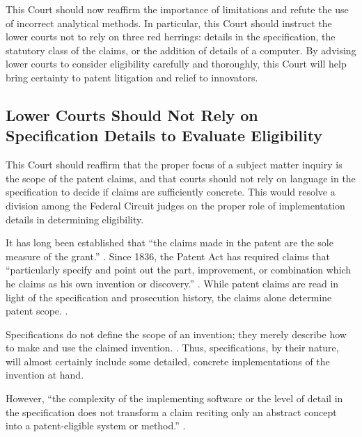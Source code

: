 \documentclass{scotus}
\begin{document}
This Court should now reaffirm the importance of  limitations and
refute the use of incorrect analytical methods. In particular, this Court should
instruct the lower courts not to rely on three red herrings: details in the
specification, the statutory class of the claims,
or the addition of details of a computer. By advising lower courts to consider
eligibility carefully and thoroughly, this Court will help bring certainty to
patent litigation and relief to innovators. 


%
%
\subsection{Lower Courts Should Not Rely on
Specification Details to Evaluate Eligibility}

This Court should reaffirm that the proper focus of a  subject
matter inquiry is the scope of the patent claims, and that courts should not
rely on language in the specification to decide if claims are sufficiently
concrete. This would resolve a division among the Federal Circuit judges on the
proper role of implementation details in determining eligibility.

It has long been established that ``the claims made in the patent are the sole
measure of the grant.''
. Since 1836, the Patent Act has
required claims that
``particularly specify and
point out the part, improvement, or combination which he claims as his own
invention or discovery.'' . %
While patent claims are read in light of the
specification and prosecution history, the claims alone determine
patent scope. .
        
Specifications do not define the scope of an invention; they merely
describe how to make and use the claimed
invention. . Thus, specifications, by their nature,
will almost certainly include some detailed, concrete implementations of the
invention at hand.

However, ``the complexity of the
implementing software or the level of detail in the specification does not
transform a claim reciting only an abstract concept into a patent-eligible
system or method.'' .
\end{document}
